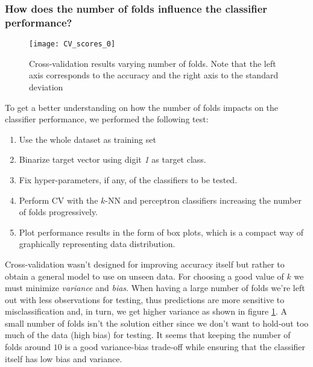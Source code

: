 \subsubsection{How does the number of folds influence the classifier performance?}
\begin{figure}
	\centering
	\texttt{[image: CV\_scores\_0]}
	\caption{Cross-validation results varying number of folds. Note that the left axis corresponds to the accuracy and the right axis to the standard deviation}
	\label{fig:CV_scores_0}
\end{figure}
To get a better understanding on how the number of folds impacts on the classifier performance, we performed the following test:
\begin{enumerate}
	\item Use the whole dataset as training set
	\item Binarize target vector using digit \textit{1} as target class.
	\item Fix hyper-parameters, if any, of the classifiers to be tested.
	\item Perform CV with the $k$-NN and perceptron classifiers increasing the number of folds progressively.
	\item Plot performance results in the form of box plots, which is a compact way of graphically representing data distribution.
\end{enumerate}

Cross-validation wasn't designed for improving accuracy itself but rather to obtain a general model to use on unseen data. For choosing a good value of $k$ we must minimize \textit{variance} and \textit{bias}. When having a large number of folds we're left out with less observations for testing, thus predictions are more sensitive to misclassification and, in turn, we get higher variance as shown in figure \ref{fig:CV_scores_0}. A small number of folds isn't the solution either since we don't want to hold-out too much of the data (high bias) for testing. It seems that keeping the number of folds around $10$ is a good variance-bias trade-off while ensuring that the classifier itself has low bias and variance.\\

